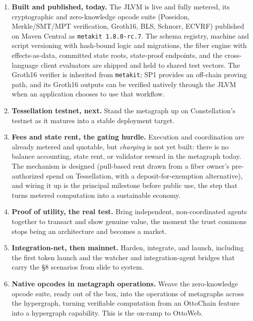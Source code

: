 \documentclass[11pt,a4paper]{article}
\begin{document}
\begin{enumerate}
    \item \textbf{Built and published, today.} The JLVM is live and fully metered, its cryptographic and zero-knowledge opcode suite (Poseidon, Merkle/SMT/MPT verification, Groth16, BLS, Schnorr, ECVRF) published on Maven Central as \texttt{metakit 1.8.0-rc.7}. The schema registry, machine and script versioning with hash-bound logic and migrations, the fiber engine with effects-as-data, committed state roots, state-proof endpoints, and the cross-language client evaluators are shipped and held to shared test vectors. The Groth16 verifier is inherited from \texttt{metakit}; SP1 provides an off-chain proving path, and its Groth16 outputs can be verified natively through the JLVM when an application chooses to use that workflow.
    \item \textbf{Tessellation testnet, next.} Stand the metagraph up on Constellation's testnet as it matures into a stable deployment target.
    \item \textbf{Fees and state rent, the gating hurdle.} Execution and coordination are already metered and quotable, but \emph{charging} is not yet built: there is no balance accounting, state rent, or validator reward in the metagraph today. The mechanism is designed (pull-based rent drawn from a fiber owner's pre-authorized spend on Tessellation, with a deposit-for-exemption alternative), and wiring it up is the principal milestone before public use, the step that turns metered computation into a sustainable economy.
    \item \textbf{Proof of utility, the real test.} Bring independent, non-coordinated agents together to transact and show genuine value, the moment the trust commons stops being an architecture and becomes a market.
    \item \textbf{Integration-net, then mainnet.} Harden, integrate, and launch, including the first token launch and the watcher and integration-agent bridges that carry the \S8 scenarios from slide to system.
    \item \textbf{Native opcodes in metagraph operations.} Weave the zero-knowledge opcode suite, ready out of the box, into the operations of metagraphs across the hypergraph, turning verifiable computation from an OttoChain feature into a hypergraph capability. This is the on-ramp to OttoWeb.
\end{enumerate}

\end{document}
